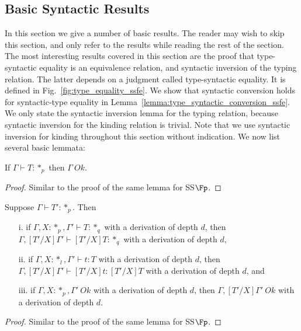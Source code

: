 \subsection{Basic Syntactic Results}
\label{subsec:basic_syntactic_lemmas_ssfe}
In this section we give a number of basic results.  The reader may
wish to skip this section, and only refer to the results while reading
the rest of the section.  The most interesting results covered in this
section are the proof that type-syntactic equality is an equivalence
relation, and syntactic inversion of the typing relation.  The latter
depends on a judgment called type-syntactic equality.  It is defined
in Fig.~\ref{fig:type_equality_ssfe}.  We show that syntactic
conversion holds for syntactic-type equality in
Lemma~\ref{lemma:type_syntactic_conversion_ssfe}.  We only state the
syntactic inversion lemma for the typing relation, because syntactic
inversion for the kinding relation is trivial.  Note that we use
syntactic inversion for kinding throughout this section without
indication.  We now list several basic lemmata:
\begin{lemma}
  If $\Gamma \vdash T:*_p$ then $\Gamma\ Ok$.
  \label{lemma:kinding_ok_ssfe}
\end{lemma}
\begin{proof}
  Similar to the proof of the same lemma for SS$\Fp$.
\end{proof}
\begin{lemma}
  Suppose $\Gamma \vdash T':*_p$.  Then
  \begin{itemize}
  \item[i.] if $\Gamma,X:*_p,\Gamma' \vdash T:*_q$ with a
    derivation of depth $d$, then $\Gamma,[T'/X]\Gamma' \vdash
    [T'/X]T:*_q$ with a derivation of depth $d$,
    
  \item[ii.] if $\Gamma, X:*_l,\Gamma' \vdash t:T$ with a
    derivation of depth $d$, then $\Gamma,[T'/X]\Gamma' \vdash
    [T'/X]t:[T'/X]T$ with a derivation of depth $d$, and
    
  \item[iii.] if $\Gamma,X:*_p,\Gamma'\ Ok$ with a derivation of depth $d$, then 
    $\Gamma,[T'/X]\Gamma'\ Ok$ with a derivation of depth $d$.
  \end{itemize}
  \label{lemma:substitution_for_kinding_ssfe}
\end{lemma}
\begin{proof}
  Similar to the proof of the same lemma for SS$\Fp$.
\end{proof}

